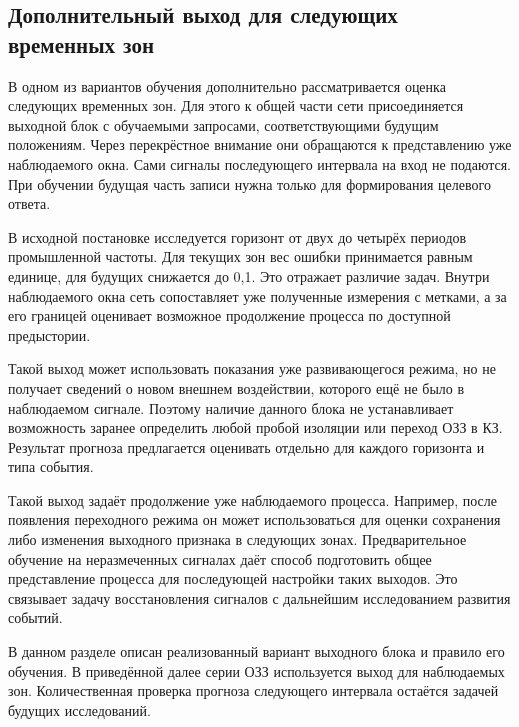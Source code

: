 \subsection{Дополнительный выход для следующих временных зон}
\label{sec:ch4_future_zones}

В одном из вариантов обучения дополнительно рассматривается
оценка следующих временных зон. Для этого к общей части
сети присоединяется выходной блок с обучаемыми запросами,
соответствующими будущим положениям. Через перекрёстное
внимание они обращаются к представлению уже наблюдаемого окна.
Сами сигналы последующего интервала на вход не подаются.
При обучении будущая часть записи нужна только
для формирования целевого ответа.

В исходной постановке исследуется горизонт
от двух до четырёх периодов промышленной частоты.
Для текущих зон вес ошибки принимается равным единице,
для будущих снижается до 0,1. Это отражает различие задач.
Внутри наблюдаемого окна сеть сопоставляет уже полученные
измерения с метками, а за его границей оценивает
возможное продолжение процесса по доступной предыстории.

Такой выход может использовать показания уже
развивающегося режима, но не получает сведений
о новом внешнем воздействии, которого ещё не было
в наблюдаемом сигнале. Поэтому наличие данного блока
не устанавливает возможность заранее определить
любой пробой изоляции или переход ОЗЗ в КЗ.
Результат прогноза предлагается оценивать отдельно для каждого
горизонта и типа события.

Такой выход задаёт продолжение уже наблюдаемого процесса.
Например, после появления переходного режима он может
использоваться для оценки сохранения либо изменения
выходного признака в следующих зонах. Предварительное обучение
на неразмеченных сигналах даёт способ подготовить общее
представление процесса для последующей настройки таких выходов.
Это связывает задачу восстановления сигналов с дальнейшим
исследованием развития событий.

В данном разделе описан реализованный вариант выходного блока
и правило его обучения. В приведённой далее серии ОЗЗ
используется выход для наблюдаемых зон. Количественная проверка
прогноза следующего интервала остаётся задачей будущих исследований.

